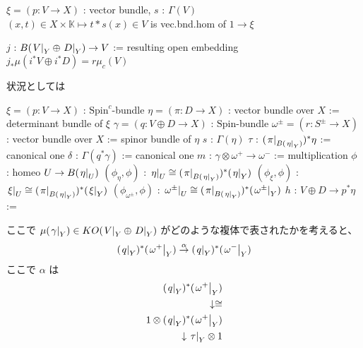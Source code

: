 \begin{Theorem}[補題]
\itemprop
  \For \(\xi = (p : V \to X)\) : vector bundle, \(s\) : \(\Gamma(V)\) \\
  \Then \((x, t) \in X \times \mathbb{K} \mapsto t * s(x) \in V\) is vec.bnd.hom of \(1 \to \xi\)
\end{Theorem}

\begin{Theorem}
\itemdefi
  \Define \(j\) : \(B(\left. {V} \right| _{Y} \oplus \left. {D} \right| _{Y}) \to V\) := resulting open embedding
\itemprop
  \Then \(j_* \mu(i^* V \oplus i^* D) = r \mu_c(V)\)
\end{Theorem}

\begin{Proof}
\itemprof
  状況としては
  \begin{itemize}
    \itemenum \(\xi = (p : V \to X)\) : \(\text{Spin}^c\)-bundle
    \itemenum \(\eta = (\pi : D \to X)\) : vector bundle over \(X\) := determinant bundle of \(\xi\)
    \itemenum \(\gamma = (q : V \oplus D \to X)\) : \(\text{Spin}\)-bundle
    \itemenum \(\omega^{\pm} = (r : S^{\pm} \to X)\) : vector bundle over \(X\) := spinor bundle of \(\eta\)
    \itemenum \(s\) : \(\Gamma(\eta)\)
    \itemenum \(\tau\) : \((\left. {\pi} \right| _{B(\left. {\eta} \right| _{Y})})^*\eta\) := canonical one
    \itemenum \(\delta\) : \(\Gamma(q^* \gamma)\) := canonical one
    \itemenum \(m\) : \(\gamma \otimes \omega^{+} \to \omega^{-}\) := multiplication
    \itemenum \(\phi\) : homeo \(U \to B(\left. {\eta} \right| _{U})\)
    \itemenum \((\phi_{\eta}, \phi)\) : \(\left. {\eta} \right| _{U} \cong (\left. {\pi} \right| _{B(\left. {\eta} \right| _{Y})})^* (\left. {\eta} \right| _{Y})\)
    \itemenum \((\phi_{\xi}, \phi)\) : \(\left. {\xi} \right| _{U} \cong (\left. {\pi} \right| _{B(\left. {\eta} \right| _{Y})})^* (\left. {\xi} \right| _{Y})\)
    \itemenum \((\phi_{\omega^{\pm}}, \phi)\) : \(\left. {\omega^{\pm}} \right| _{U} \cong (\left. {\pi} \right| _{B(\left. {\eta} \right| _{Y})})^* (\left. {\omega^{\pm}} \right| _{Y})\)
    \itemenum \(h\) : \(V \oplus D \to p^*\eta\) := 
  \end{itemize}
  ここで \(\mu(\left. {\gamma} \right| _{Y}) \in KO(\left. {V} \right| _{Y} \oplus \left. {D} \right| _{Y})\) がどのような複体で表されたかを考えると、
  \[
    (\left. {q} \right| _{Y})^*(\left. {\omega^{+}} \right| _{Y}) \overset{\alpha}{\to} (\left. {q} \right| _{Y})^*(\left. {\omega^{-}} \right| _{Y})
  \]
  ここで \(\alpha\) は
  \begin{align*}
    (\restr{q}{Y})^*(\restr{\omega^{+}}{Y}) \\
    \downarrow \cong \\
    1 \otimes (\restr{q}{Y})^*(\restr{\omega^{+}}{Y}) \\
    \downarrow \restr{\tau}{Y} \otimes 1 \\

\end{align*}
\end{Proof}

